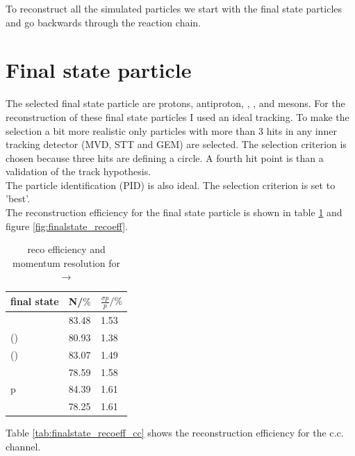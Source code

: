 To reconstruct all the simulated particles we start with the final state particles and go backwards through the reaction chain.

\section{Final state particle}
	The selected final state particle are protons, antiproton, \piminus, \piplus, \kminus and \kplus mesons.
	For the reconstruction of these final state particles I used an ideal tracking. 
	To make the selection a bit more realistic only particles with more than 3 hits in any inner tracking detector (MVD, STT and GEM)
	are selected.
	The selection criterion is chosen because three hits are defining a circle.
	A fourth hit point is than a validation of the track hypothesis.\\
	The particle identification (PID) is also ideal. 
	The selection criterion is set to 'best'.\\
	\vspace{11pt} 
	The reconstruction  efficiency for the final state particle is shown in table \ref{tab:finalstate_recoeff} and figure \ref{fig:finalstate_recoeff}.
	
	\begin{table}
		\centering
		\caption{reco efficiency and momentum resolution for \pbarpSystem $\rightarrow$ \excitedcascade \anticascade}
		\label{tab:finalstate_recoeff}
		\begin{tabular}{lll}
			\hline
			final state & N/$\%$ & $\frac{\sigma p}{p}/\%$ \\
			\hline
			\hline
			\piminus & 83.48 & 1.53\\
			\piplusone(\anticascade) &  80.93& 1.38 \\
			\piplustwo(\alam) &  83.07& 1.49\\
			\kminus&  78.59& 1.58\\
			p &  84.39& 1.61\\
			\antiproton & 78.25 & 1.61\\\hline
			 
		\end{tabular}
	\end{table}
	
	Table \ref{tab:finalstate_recoeff_cc} shows the reconstruction efficiency for the c.c. channel.
	
